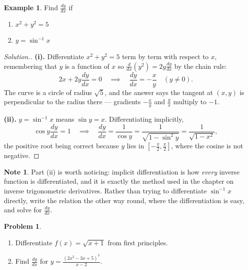 \documentclass[11pt,a4paper]{article}
\theoremstyle{definition}
\newtheorem{example}[thm]{Example}
\newtheorem{note}[thm]{Note}
\newtheorem{problemx}{Problem}[section]
\newenvironment{problem}{\begin{problemx}}{\end{problemx}}
\newenvironment{solution}
  {\renewcommand{\qedsymbol}{}\begin{proof}[\textit{Solution}.]}
  {\end{proof}}
\begin{document}
\begin{example}

Find $\frac{dy}{dx}$ if
\begin{enumerate}
\item $x^2+y^2=5$\\
\item $y=\sin^{-1}x$
\end{enumerate}
\end{example}

\begin{solution}
\textbf{(i).} Differentiate $x^{2}+y^{2}=5$ term by term with respect to $x$,
remembering that $y$ is a function of $x$ so $\frac{d}{dx}\left(y^{2}\right)
=2y\frac{dy}{dx}$ by the chain rule:
$$2x+2y\frac{dy}{dx}=0 \quad \implies\quad 
\frac{dy}{dx}=-\frac{x}{y}\quad (y\neq 0).$$
The curve is a circle of radius $\sqrt{5}$, and the answer says the tangent at
$(x,y)$ is perpendicular to the radius there --- gradients $-\frac{x}{y}$ and
$\frac{y}{x}$ multiply to $-1$.

\textbf{(ii).} $y=\sin^{-1}x$ means $\sin y=x$. Differentiating implicitly,
$$\cos y\frac{dy}{dx}=1 \quad \implies\quad 
\frac{dy}{dx}=\frac{1}{\cos y}=\frac{1}{\sqrt{1-\sin^{2}y}}=\frac{1}{\sqrt{1-x^{2}}},$$
the positive root being correct because $y$ lies in
$\left[-\frac{\pi}{2},\frac{\pi}{2}\right]$, where the cosine is not negative.
\end{solution}

\begin{note}
Part (ii) is worth noticing: implicit differentiation is how \emph{every} inverse
function is differentiated, and it is exactly the method used in the chapter on
inverse trigonometric derivatives. Rather than trying to differentiate
$\sin^{-1}x$ directly, write the relation the other way round, where the
differentiation is easy, and solve for $\frac{dy}{dx}$.
\end{note}
\pagebreak

\begin{problem}
\begin{enumerate}
\item[(a).] Differentiate $f(x)=\sqrt{x+1}$ from first principles.
\item[(b).] Find $\frac{dy}{dx}$ for
$y=\frac{\left(2x^{2}-3x+5\right)^{3}}{x-2}$.
\end{enumerate}
\end{problem}
\end{document}
